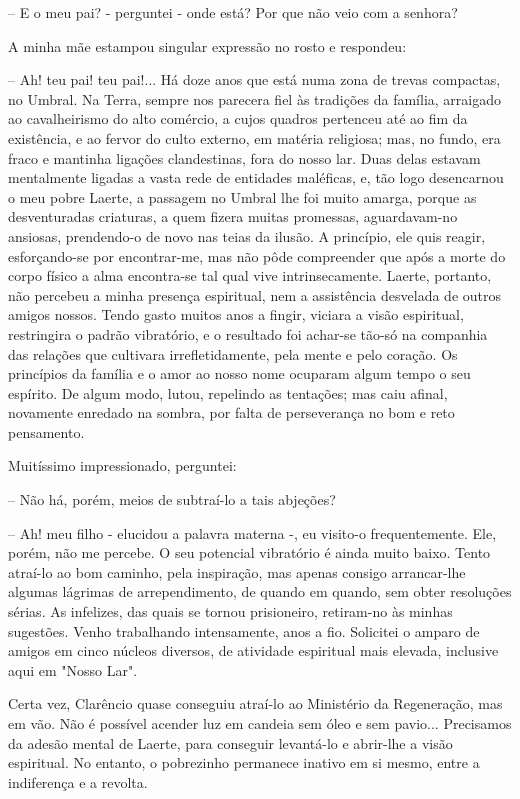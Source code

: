 \documentclass[portuguese,12pt,a4paper]{scrbook}
\begin{document}
	– E o meu pai? - perguntei - onde está? Por que não veio com a senhora?
	
	A minha mãe estampou singular expressão no rosto e respondeu:
	
	
	– Ah! teu pai! teu pai!... Há doze anos que está numa zona de trevas compactas, no Umbral. Na Terra, sempre nos parecera fiel às tradições da família, arraigado ao cavalheirismo do alto comércio, a cujos quadros pertenceu até ao fim da existência, e ao fervor do culto externo, em matéria religiosa; mas, no fundo, era fraco e mantinha ligações clandestinas, fora do nosso lar. Duas delas estavam mentalmente ligadas a vasta rede de entidades maléficas, e, tão logo desencarnou o meu pobre Laerte, a passagem no Umbral lhe foi muito amarga, porque as desventuradas criaturas, a quem fizera muitas promessas, aguardavam-no ansiosas, prendendo-o de novo nas teias da ilusão. A princípio, ele quis reagir, esforçando-se por encontrar-me, mas não pôde compreender que após a morte do corpo físico a alma encontra-se tal qual vive intrinsecamente. Laerte, portanto, não percebeu a minha presença espiritual, nem a assistência desvelada de outros amigos nossos. Tendo gasto muitos anos a fingir, viciara a visão espiritual, restringira o padrão vibratório, e o resultado foi achar-se tão-só na companhia das relações que cultivara irrefletidamente, pela mente e pelo coração. Os princípios da família e o amor ao nosso nome ocuparam algum tempo o seu espírito. De algum modo, lutou, repelindo as tentações; mas caiu afinal, novamente enredado na sombra, por falta de perseverança no bom e reto pensamento.
	
	Muitíssimo impressionado, perguntei:
	
	– Não há, porém, meios de subtraí-lo a tais abjeções?
	
	– Ah! meu filho - elucidou a palavra materna -, eu visito-o frequentemente. Ele, porém, não me percebe. O seu potencial vibratório é ainda muito baixo. Tento atraí-lo ao bom caminho, pela inspiração, mas apenas consigo arrancar-lhe algumas lágrimas de arrependimento, de quando em quando, sem obter resoluções sérias. As infelizes, das quais se tornou prisioneiro, retiram-no às minhas sugestões. Venho trabalhando intensamente, anos a fio. Solicitei o amparo de amigos em cinco núcleos diversos, de atividade espiritual mais elevada, inclusive aqui em "Nosso Lar".
	
	Certa vez, Clarêncio quase conseguiu atraí-lo ao Ministério da Regeneração, mas em vão. Não é possível acender luz em candeia sem óleo e sem pavio... Precisamos da adesão mental de Laerte, para conseguir levantá-lo e abrir-lhe a visão espiritual. No entanto, o pobrezinho permanece inativo em si mesmo, entre a indiferença e a revolta.
	
\end{document}
